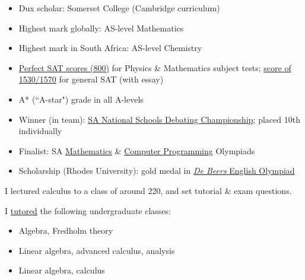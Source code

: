 \documentclass[10pt,a4paper,ragged2e,withhyper]{altacv}
\begin{document}
\begin{paracol}{2}
\begin{itemize}
    \item Dux scholar: Somerset College (Cambridge curriculum)
    \item Highest mark globally: AS-level Mathematics
    \item Highest mark in South Africa: AS-level Chemistry
    \item \href{https://dariotrinchero.github.io/files/sat1.pdf}{Perfect SAT scores (800)} for Physics \&
		Mathematics subject tests; \href{https://dariotrinchero.github.io/files/sat2.pdf}{score of 1530/1570}
		for general SAT (with essay)
    \item A* (``A-star") grade in all A-levels
    \item Winner (in team): \href{https://sadebating.org/phalaborwa-2016/}{SA National Schools Debating Championship};
		placed 10th individually
    \item Finalist: SA \href{https://www.samf.ac.za/en/sa-mathematics-olympiad}{Mathematics}
		\& \href{https://olympiad.org.za/programming-olympiad/}{Computer Programming} Olympiads
    \item Scholarship (Rhodes University): gold medal in
		\href{https://sacee.org.za/projects/english-olympiad/}{\emph{De Beers} English Olympiad}
\end{itemize}


\switchcolumn %


\smallskip
I lectured calculus to a class of around 220, and set tutorial \& exam questions. 

\divider %

\smallskip
I \href{https://dariotrinchero.github.io/teaching/2018-math-demi}{tutored} the
following undergraduate classes:
\medskip
\begin{itemize}
\item {} Algebra, Fredholm theory
\item {} Linear algebra, advanced calculus, analysis
\item {} Linear algebra, calculus
\end{itemize}


\end{paracol}
\end{document}
